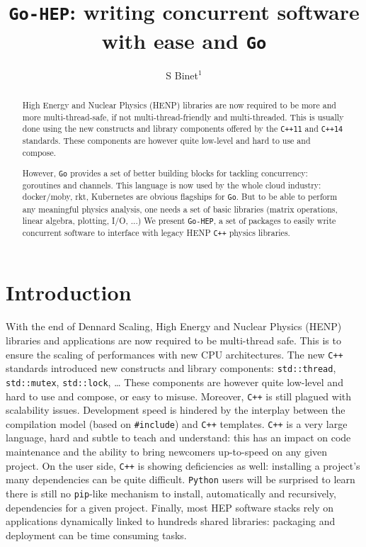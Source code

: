 \documentclass[a4paper]{jpconf}
\begin{document}
\title{\texttt{Go-HEP}: writing concurrent software with ease and \texttt{Go}}

\author{S Binet$^1$}

\address{$^1$ Laboratoire de Physique de Clermont-Ferrand, CNRS/IN2P3, FR}


\begin{abstract}
High Energy and Nuclear Physics (HENP) libraries are now required to be more and
more multi-thread-safe, if not multi-thread-friendly and multi-threaded.
This is usually done using the new constructs and library components offered by
the \texttt{C++11} and \texttt{C++14} standards.
These components are however quite low-level and hard to use and compose.

However, \texttt{Go} provides a set of better building
blocks for tackling concurrency: goroutines and channels.
This language is now used by the whole cloud industry: docker/moby, rkt,
Kubernetes are obvious flagships for \texttt{Go}.
But to be able to perform any meaningful physics analysis, one needs a set of
basic libraries (matrix operations, linear algebra, plotting, I/O, ...)
We present \texttt{Go-HEP}, a set of packages to easily write concurrent software to
interface with legacy HENP \texttt{C++} physics libraries.

\end{abstract}

\section{Introduction}

With the end of Dennard Scaling, High Energy and Nuclear Physics (HENP) libraries and applications are now required to be multi-thread safe.
This is to ensure the scaling of performances with new CPU architectures.
The new \texttt{C++} standards introduced new constructs and library components: \texttt{std::thread}, \texttt{std::mutex}, \texttt{std::lock}, \ldots
These components are however quite low-level and hard to use and compose, or easy to misuse.
Moreover, \texttt{C++} is still plagued with scalability issues.
Development speed is hindered by the interplay between the compilation model (based on \texttt{\#include}) and \texttt{C++} templates.
\texttt{C++} is a very large language, hard and subtle to teach and understand: this has an impact on code maintenance and the ability to bring newcomers up-to-speed on any given project.
On the user side, \texttt{C++} is showing deficiencies as well: installing a project's many dependencies can be quite difficult.
\texttt{Python} users will be surprised to learn there is still no \texttt{pip}-like mechanism to install, automatically and recursively, dependencies for a given project.
Finally, most HEP software stacks rely on applications dynamically linked to hundreds shared libraries: packaging and deployment can be time consuming tasks.
\end{document}
